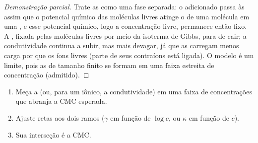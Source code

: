 \begin{proof}[Demonstração parcial]
Trate as  como uma fase separada: o  adicionado passa às 
assim que o potencial químico das moléculas livres atinge o de uma molécula em uma
, e esse potencial químico, logo a concentração livre, permanece então fixo.
A , fixada pelas moléculas livres por meio da isoterma de Gibbs,
para de cair; a condutividade continua a subir, mas mais devagar, já que as 
carregam menos carga por  que os íons livres (parte de seus contraíons está
ligada). O modelo é um limite, pois as  de tamanho finito se formam em uma
faixa estreita de concentração (admitido).
\end{proof}

\begin{method}\label{met:b3:colloids:cmc}
\begin{enumerate}
  \item Meça a  (ou, para um  iônico, a condutividade)
        em uma faixa de concentrações que abranja a CMC esperada.
  \item Ajuste retas aos dois ramos ($\gamma$ em função de $\log c$, ou $\kappa$ em função de $c$).
  \item Sua interseção é a CMC.
\end{enumerate}
\end{method}

